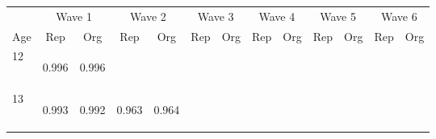 \begin{center}
\begin{tabular}{lcccccccccccc}
\hline \noalign{\smallskip} & \multicolumn{2}{c}{Wave 1} & \multicolumn{2}{c}{Wave 2} & \multicolumn{2}{c}{Wave 3} & \multicolumn{2}{c}{Wave 4} & \multicolumn{2}{c}{Wave 5} & \multicolumn{2}{c}{Wave 6}\\
Age & Rep & Org & Rep & Org & Rep & Org & Rep & Org & Rep & Org & Rep & Org\\
\noalign{\smallskip}\hline \noalign{\smallskip}12 & \begin{bf}0.996\end{bf} & \begin{rm}0.996\end{rm} & \begin{bf}\end{bf} & \begin{rm}\end{rm} & \begin{bf}\end{bf} & \begin{rm}\end{rm} & \begin{bf}\end{bf} & \begin{rm}\end{rm} & \begin{bf}\end{bf} & \begin{rm}\end{rm} & \begin{bf}\end{bf} & \begin{rm}\end{rm}\\
13 & \begin{bf}0.993\end{bf} & \begin{rm}0.992\end{rm} & \begin{bf}0.963\end{bf} & \begin{rm}0.964\end{rm} & \begin{bf}\end{bf} & \begin{rm}\end{rm} & \begin{bf}\end{bf} & \begin{rm}\end{rm} & \begin{bf}\end{bf} & \begin{rm}\end{rm} & \begin{bf}\end{bf} & \begin{rm}\end{rm}\\

\end{tabular}
\end{center}
